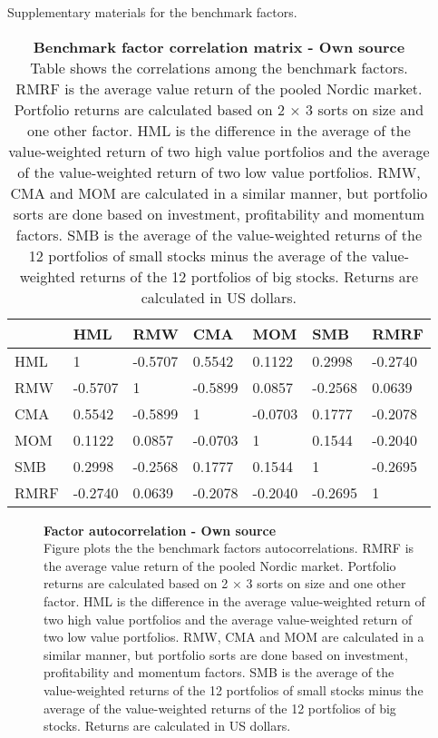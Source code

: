\documentclass[12pt]{article}
\begin{document}
Supplementary materials for the benchmark factors. 

\begin{table}[H]
\footnotesize
\caption[Benchmark factor correlation matrix]{\textbf{Benchmark factor correlation matrix \textnormal{- Own source}}\\ Table shows the correlations among the benchmark factors. RMRF is the average value return of the pooled Nordic market. Portfolio returns are calculated based on 2 × 3 sorts on size and one other factor. HML is the difference in the average of the value-weighted return of two high value portfolios and the average of the value-weighted return of two low value portfolios. RMW, CMA and MOM are calculated in a similar manner, but portfolio sorts are done based on investment, profitability and momentum factors. SMB is the average of the value-weighted returns of the 12 portfolios of small stocks minus the average of the value-weighted returns of the 12 portfolios of big stocks. Returns are calculated in US dollars.}
\label{table:FFfactorsCorrelations}
\centering
{}
\begin{tabularx}{\textwidth}{@{\extracolsep{4pt}} X Y Y Y Y Y Y} 
\toprule
& HML & RMW & CMA & MOM & SMB & RMRF \\
\midrule
HML & 1 & -0.5707 & 0.5542 & 0.1122 & 0.2998 & -0.2740 \\
RMW & -0.5707 & 1 & -0.5899 & 0.0857 & -0.2568 & 0.0639 \\
CMA & 0.5542 & -0.5899 & 1 & -0.0703 & 0.1777 & -0.2078 \\
MOM & 0.1122 & 0.0857 & -0.0703 & 1 & 0.1544 & -0.2040 \\
SMB & 0.2998 & -0.2568 & 0.1777 & 0.1544 & 1 & -0.2695 \\
RMRF & -0.2740 & 0.0639 & -0.2078 & -0.2040 & -0.2695 & 1 \\
\bottomrule
\end{tabularx}
\end{table}

\begin{figure}[H]
\centering
\caption[Factor autocorrelation]{\textbf{Factor autocorrelation \textnormal{- Own source}}\\ Figure plots the the benchmark factors autocorrelations. RMRF is the average value return of the pooled Nordic market. Portfolio returns are calculated based on 2 × 3 sorts on size and one other factor. HML is the difference in the average value-weighted return of two high value portfolios and the average value-weighted return of two low value portfolios. RMW, CMA and MOM are calculated in a similar manner, but portfolio sorts are done based on investment, profitability and momentum factors. SMB is the average of the value-weighted returns of the 12 portfolios of small stocks minus the average of the value-weighted returns of the 12 portfolios of big stocks. Returns are calculated in US dollars.}

\label{plot:factor_autocorrelation}
\end{figure}
\end{document}
